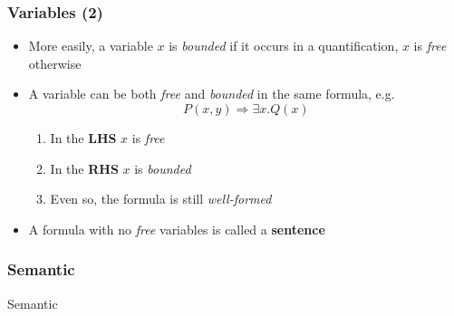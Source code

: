 \documentclass{beamer}
\begin{document}
                \begin{frame}
                    \frametitle{Variables (2)}
                    \begin{itemize}
                        \item More easily, a variable $ x $ is \textit{bounded} if it occurs in a quantification, $ x $ is \textit{free} otherwise
                        \item A variable can be both \textit{free} and \textit{bounded} in the same formula, e.g.
                        \[
                            P(x, y) \Rightarrow \exists x.Q(x)    
                        \]
                        \begin{enumerate}
                            \item In the \textbf{LHS} $ x $ is \textit{free}
                            \item In the \textbf{RHS} $ x $ is \textit{bounded}
                            \item Even so, the formula is still \textit{well-formed}
                        \end{enumerate}
                        \item A formula with no \textit{free} variables is called a \textbf{sentence}
                    \end{itemize}
                \end{frame}

            \subsubsection{Semantic}
                \begin{frame}
                    \begin{center}
                        \begin{Huge}
                            \textcolor{title_blue}{Semantic}
                        \end{Huge}
                    \end{center}
                \end{frame}
\end{document}
